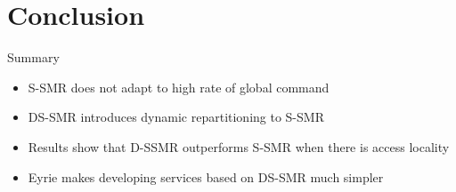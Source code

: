 \documentclass[10pt]{beamer}
\begin{document}
\section{Conclusion}

\begin{frame}{Summary}
  \begin{itemize}
    \item S-SMR does not adapt to high rate of global command
    \item DS-SMR introduces dynamic repartitioning to S-SMR
    \item Results show that D-SSMR outperforms S-SMR when there is access locality
    \item Eyrie makes developing services based on DS-SMR much simpler
  \end{itemize}
  
\end{frame}


\end{document}
